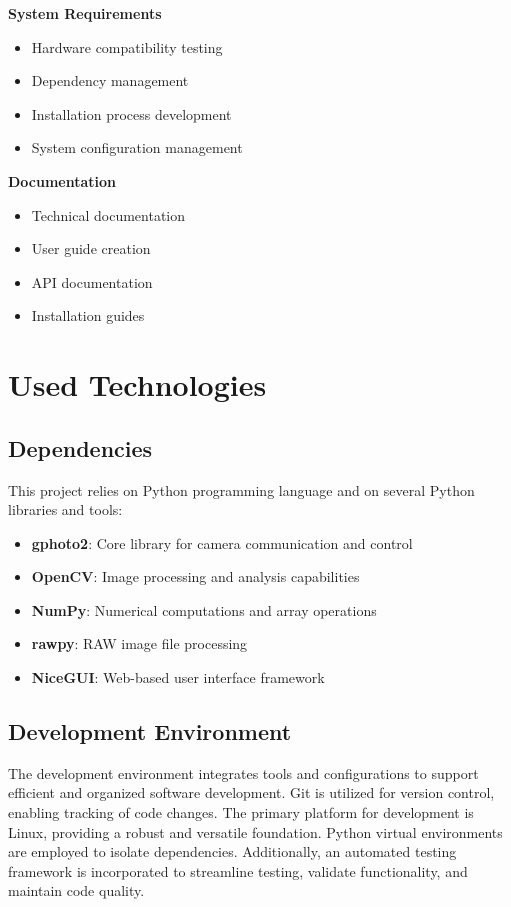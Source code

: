 \textbf{System Requirements}
\begin{itemize}
    \item Hardware compatibility testing
    \item Dependency management
    \item Installation process development
    \item System configuration management
\end{itemize}

\textbf{Documentation}
\begin{itemize}
    \item Technical documentation
    \item User guide creation
    \item API documentation
    \item Installation guides
\end{itemize}

\section{Used Technologies} %

\subsection{Dependencies}
This project relies on Python programming language and on several Python libraries and tools:

\begin{itemize}
    \item \textbf{gphoto2}: Core library for camera communication and control
    \item \textbf{OpenCV}: Image processing and analysis capabilities
    \item \textbf{NumPy}: Numerical computations and array operations
    \item \textbf{rawpy}: RAW image file processing
    \item \textbf{NiceGUI}: Web-based user interface framework
\end{itemize}

\subsection{Development Environment}
The development environment integrates tools and configurations to support efficient and organized software development. Git is utilized for version control, enabling tracking of code changes. The primary platform for development is Linux, providing a robust and versatile foundation. Python virtual environments are employed to isolate dependencies. Additionally, an automated testing framework is incorporated to streamline testing, validate functionality, and maintain code quality.

